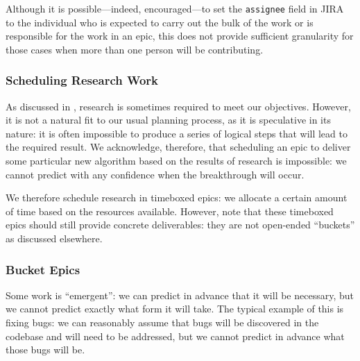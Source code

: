 Although it is possible---indeed, encouraged---to set the \texttt{assignee} field in \gls{JIRA} to the individual who is expected to carry out the bulk of the work or is responsible for the work in an \gls{epic}, this does not provide sufficient granularity for those cases when more than one person will be contributing.



\subsubsection{Scheduling Research Work} \label{sec:research}

As discussed in , research is sometimes required
to meet our objectives. However, it is not a natural fit to our usual
planning process, as it is speculative in its nature: it is often
impossible to produce a series of logical steps that will lead to the
required result. We acknowledge, therefore, that scheduling an \gls{epic} to
deliver some particular new \gls{algorithm} based on the results of research
is impossible: we cannot predict with any confidence when the
breakthrough will occur.

We therefore schedule research in \gls{timebox}ed \glspl{epic}: we allocate a certain amount of time based on the resources available.
However, note that these \gls{timebox}ed \glspl{epic} should still provide concrete deliverables: they are not open-ended ``buckets'' as discussed elsewhere.

\subsubsection{Bucket Epics} \label{sec:bucket}

Some work is ``emergent'': we can predict in advance that it will be necessary, but we cannot predict exactly what form it will take.
The typical example of this is fixing bugs: we can reasonably assume that bugs will be discovered in the codebase and will need to be addressed, but we cannot predict in advance what those bugs will be.

